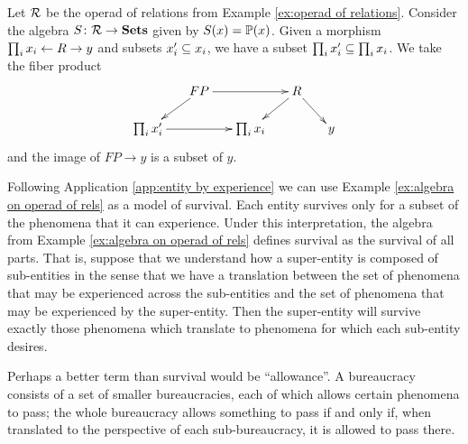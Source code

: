 \documentclass[CT4S-EN-RU]{subfiles}
\begin{document}
\begin{example}\label{ex:algebra on operad of rels}

Let $\mcR$ be the operad of relations from Example \ref{ex:operad of relations}. Consider the algebra $S\taking\mcR\to\Sets$ given by $S(x)=\PP(x)$. Given a morphism $\prod_ix_i\from R\to y$ and subsets $x_i'\ss x_i$, we have a subset $\prod_ix_i'\ss\prod_ix_i$. We take the fiber product
$$\xymatrix@=15pt{&FP\ar[rr]\ar[ld]&&R\ar[ld]\ar[rd]\\\prod_ix_i'\ar[rr]&&\prod_ix_i&&y}$$
and the image of $FP\to y$ is a subset of $y$. 

\end{example}

\begin{application}\label{app:desire}

Following Application \ref{app:entity by experience} we can use Example \ref{ex:algebra on operad of rels} as a model of survival. Each entity survives only for a subset of the phenomena that it can experience. Under this interpretation, the algebra from Example \ref{ex:algebra on operad of rels} defines survival as the survival of all parts. That is, suppose that we understand how a super-entity is composed of sub-entities in the sense that we have a translation between the set of phenomena that may be experienced across the sub-entities and the set of phenomena that may be experienced by the super-entity. Then the super-entity will survive exactly those phenomena which translate to phenomena for which each sub-entity desires. 

Perhaps a better term than survival would be “allowance”. A bureaucracy consists of a set of smaller bureaucracies, each of which allows certain phenomena to pass; the whole bureaucracy allows something to pass if and only if, when translated to the perspective of each sub-bureaucracy, it is allowed to pass there.

\end{application}
\end{document}
